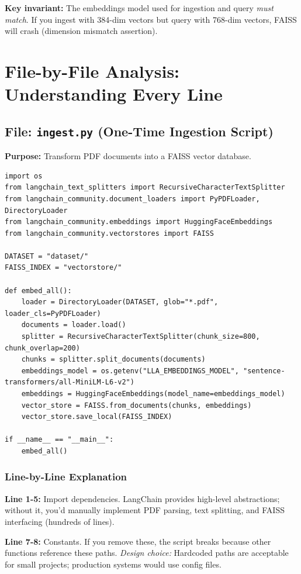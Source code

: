 \documentclass[11pt,a4paper]{article}
\begin{document}
\textbf{Key invariant:} The embeddings model used for ingestion and query \textit{must match}. If you ingest with 384-dim vectors but query with 768-dim vectors, FAISS will crash (dimension mismatch assertion).

\section{File-by-File Analysis: Understanding Every Line}

\subsection{File: \texttt{ingest.py} (One-Time Ingestion Script)}

\textbf{Purpose:} Transform PDF documents into a FAISS vector database.

\begin{lstlisting}
import os
from langchain_text_splitters import RecursiveCharacterTextSplitter
from langchain_community.document_loaders import PyPDFLoader, DirectoryLoader
from langchain_community.embeddings import HuggingFaceEmbeddings
from langchain_community.vectorstores import FAISS

DATASET = "dataset/"
FAISS_INDEX = "vectorstore/"

def embed_all():
    loader = DirectoryLoader(DATASET, glob="*.pdf", loader_cls=PyPDFLoader)
    documents = loader.load()
    splitter = RecursiveCharacterTextSplitter(chunk_size=800, chunk_overlap=200)
    chunks = splitter.split_documents(documents)
    embeddings_model = os.getenv("LLA_EMBEDDINGS_MODEL", "sentence-transformers/all-MiniLM-L6-v2")
    embeddings = HuggingFaceEmbeddings(model_name=embeddings_model)
    vector_store = FAISS.from_documents(chunks, embeddings)
    vector_store.save_local(FAISS_INDEX)

if __name__ == "__main__":
    embed_all()
\end{lstlisting}

\subsubsection{Line-by-Line Explanation}

\textbf{Line 1-5:} Import dependencies. LangChain provides high-level abstractions; without it, you'd manually implement PDF parsing, text splitting, and FAISS interfacing (hundreds of lines).

\textbf{Line 7-8:} Constants. If you remove these, the script breaks because other functions reference these paths. \textit{Design choice:} Hardcoded paths are acceptable for small projects; production systems would use config files.
\end{document}
